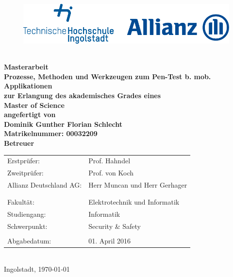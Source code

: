 
\begin{titlepage}

\phantom{tmpText}

\vspace{1cm}

\begin{figure}[h!]
\centering
\includegraphics[width=\textwidth]{bilder/thi_allianz_logo}
\end{figure}

  \begin{center}

    $ $
    \\[3ex]
    \textbf{{\large Masterarbeit} \\[3ex]
    {\LARGE Prozesse, Methoden und Werkzeugen zum Pen-Test b. mob. Applikationen}\\[6ex]
    zur Erlangung des akademisches Grades eines \\
    Master of Science\\[2ex]
    \vfill
    angefertigt von \\
    Dominik Gunther Florian Schlecht \\
    {\small \normalfont Matrikelnummer: 00032209}\\[2ex] %
    \vfill
    Betreuer} \\[2ex]
    \begin{tabular}{ll}
      Erstprüfer: & Prof. Hahndel \\
      Zweitprüfer: & Prof. von Koch \\
      Allianz Deutschland AG: & Herr Muncan und Herr Gerhager\\
      \\
      \\
      Fakultät: & Elektrotechnik und Informatik\\
      Studiengang: & Informatik\\
      Schwerpunkt: & Security \& Safety\\
      \\
      Abgabedatum: & 01. April 2016
    \end{tabular} \\[2ex]
    \vfill
    Ingolstadt, \today
  \end{center}
\end{titlepage}
